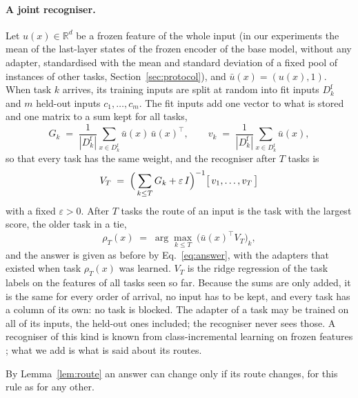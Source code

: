 \paragraph{A joint recogniser.} Let $u(x) \in \mathbb{R}^d$ be a frozen feature of the whole
input (in our experiments the mean of the last-layer states of the frozen encoder of the base
model, without any adapter, standardised with the mean and standard deviation of a fixed pool of
instances of other tasks, Section~\ref{sec:protocol}), and
$\bar u(x) = (u(x), 1)$. When task $k$ arrives, its
training inputs are split at random into fit inputs $D_k^{\mathrm{f}}$ and $m$ held-out inputs
$c_1, \dots, c_m$. The fit inputs add one vector to what is stored and one matrix to a sum kept for
all tasks,
\[
  G_k \;=\; \frac{1}{|D_k^{\mathrm{f}}|} \sum_{x \in D_k^{\mathrm{f}}} \bar u(x)\, \bar u(x)^{\!\top}, \qquad
  v_k \;=\; \frac{1}{|D_k^{\mathrm{f}}|} \sum_{x \in D_k^{\mathrm{f}}} \bar u(x),
\]
so that every task has the same weight, and the recogniser after $T$ tasks is
\begin{equation}
  V_T \;=\; \Bigl(\, \sum_{k \le T} G_k + \varepsilon\, I \Bigr)^{-1} \bigl[\, v_1, \dots, v_T \,\bigr]
  \label{eq:recogniser}
\end{equation}
with a fixed $\varepsilon > 0$. After $T$ tasks the route
of an input is the task with the largest score, the older task in a tie,
\begin{equation}
  \rho_T(x) \;=\; \arg\max_{k \le T}\ \bigl(\bar u(x)^{\!\top} V_T\bigr)_k ,
  \label{eq:jointroute}
\end{equation}
and the answer is given as before by Eq.~\eqref{eq:answer}, with the adapters that existed when
task $\rho_T(x)$ was learned. $V_T$ is the ridge regression of the task labels on the features of
all tasks seen so far. Because the sums are only added, it is the same for every order of
arrival, no input has to be kept, and every task has a column of its own: no task is blocked. The
adapter of a task may be trained on all of its inputs, the held-out ones included; the recogniser
never sees those. A recogniser of this kind is known from class-incremental learning on frozen
features \citep{mcdonnell2023ranpac,zhuang2022acil}; what we add is what is said about its routes.

By Lemma~\ref{lem:route} an answer can change only if its route changes, for this rule as for
any other.

